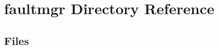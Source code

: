 \section{faultmgr Directory Reference}
\label{dir_2099093b52ab0f339ad2d38358990630}
\subsection*{Files}
\begin{DoxyCompactItemize}
\end{DoxyCompactItemize}

